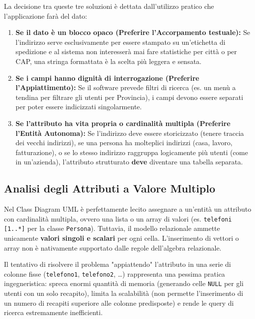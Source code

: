 \begin{tip}
La decisione tra queste tre soluzioni è dettata dall'utilizzo pratico che l'applicazione farà del dato:
\begin{enumerate}
    \item \textbf{Se il dato è un blocco opaco (Preferire l'Accorpamento testuale):} Se l'indirizzo serve esclusivamente per essere stampato su un'etichetta di spedizione e al sistema non interesserà mai fare statistiche per città o per CAP, una stringa formattata è la scelta più leggera e sensata.
    \item \textbf{Se i campi hanno dignità di interrogazione (Preferire l'Appiattimento):} Se il software prevede filtri di ricerca (es. un menù a tendina per filtrare gli utenti per Provincia), i campi devono essere separati per poter essere indicizzati singolarmente.
    \item \textbf{Se l'attributo ha vita propria o cardinalità multipla (Preferire l'Entità Autonoma):} Se l'indirizzo deve essere storicizzato (tenere traccia dei vecchi indirizzi), se una persona ha molteplici indirizzi (casa, lavoro, fatturazione), o se lo stesso indirizzo raggruppa logicamente più utenti (come in un'azienda), l'attributo strutturato \textbf{deve} diventare una tabella separata.
\end{enumerate}
\end{tip}

\subsection{Analisi degli Attributi a Valore Multiplo}

Nel Class Diagram UML è perfettamente lecito assegnare a un'entità un attributo con cardinalità multipla, ovvero una lista o un array di valori (es. \texttt{telefoni [1..*]} per la classe \texttt{Persona}). 
Tuttavia, il modello relazionale ammette unicamente \textbf{valori singoli e scalari} per ogni cella. L'inserimento di vettori o array non è nativamente supportato dalle regole dell'algebra relazionale.

Il tentativo di risolvere il problema "appiattendo" l'attributo in una serie di colonne fisse (\texttt{telefono1}, \texttt{telefono2}, \dots) rappresenta una pessima pratica ingegneristica: spreca enormi quantità di memoria (generando celle \texttt{NULL} per gli utenti con un solo recapito), limita la scalabilità (non permette l'inserimento di un numero di recapiti superiore alle colonne predisposte) e rende le query di ricerca estremamente inefficienti.

